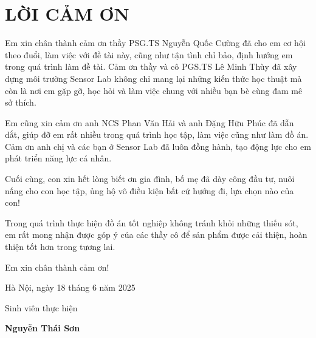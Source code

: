 \section*{LỜI CẢM ƠN}
    \thispagestyle{empty}

    Em xin chân thành cảm ơn thầy PSG.TS Nguyễn Quốc Cường đã cho em cơ hội theo đuổi, làm việc với đề tài này, cũng như tận tình chỉ bảo, định hướng em trong quá trình làm đề tài. Cảm ơn thầy và cô PGS.TS Lê Minh Thùy đã xây dựng môi trường Sensor Lab không chỉ mang lại những kiến thức học thuật mà còn là nơi em gặp gỡ, học hỏi và làm việc chung với nhiều bạn bè cùng đam mê sở thích.

    Em cũng xin cảm ơn anh NCS Phan Văn Hải và anh Đặng Hữu Phúc đã dẫn dắt, giúp đỡ em rất nhiều trong quá trình học tập, làm việc cũng như làm đồ án. Cảm ơn anh chị và các bạn ở Sensor Lab đã luôn đồng hành, tạo động lực cho em phát triển năng lực cá nhân.

    Cuối cùng, con xin hết lòng biết ơn gia đình, bố mẹ đã dày công đầu tư, nuôi nấng cho con học tập, ủng hộ vô điều kiện bất cứ hướng đi, lựa chọn nào của con!

    Trong quá trình thực hiện đồ án tốt nghiệp không tránh khỏi những thiếu sót, em rất mong nhận được góp ý của các thầy cô để sản phẩm được cải thiện, hoàn thiện tốt hơn trong tương lai.

    Em xin chân thành cảm ơn!

\vspace{6pt}
    \hspace{7cm}Hà Nội, ngày 18 tháng 6 năm 2025
        
        \hspace{8.6cm} Sinh viên thực hiện      %

\vspace{2cm}
    \hspace{8.8cm}\textbf{Nguyễn Thái Sơn} %